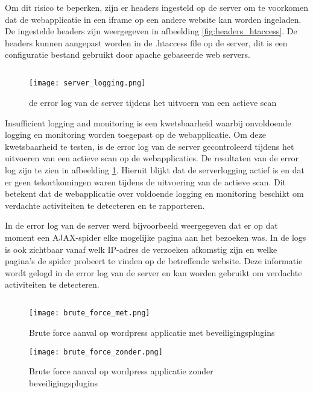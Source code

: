 Om dit risico te beperken, zijn er headers ingesteld op de server om te voorkomen dat de webapplicatie in een iframe op een 
andere website kan worden ingeladen. De ingestelde headers zijn weergegeven in afbeelding \ref{fig:headers_htaccess}. De 
headers kunnen aangepast worden in de .htaccess file op de server, dit is een configuratie bestand gebruikt door apache 
gebaseerde web servers.

\subsection{}
\begin{figure}
    \centering
    \texttt{[image: server\_logging.png]}
    \caption[de error log van de server tijdens het uitvoern van een actieve scan]{de error log van de server tijdens het uitvoern van een actieve scan}
    \label{fig:server_logging}
\end{figure}
Insufficient logging and monitoring is een kwetsbaarheid waarbij onvoldoende logging en monitoring worden toegepast op de 
webapplicatie. Om deze kwetsbaarheid te testen, is de error log van de server gecontroleerd tijdens het uitvoeren van een 
actieve scan op de webapplicaties. De resultaten van de error log zijn te zien in afbeelding \ref{fig:server_logging}. 
Hieruit blijkt dat de serverlogging actief is en dat er geen tekortkomingen waren tijdens de uitvoering van de actieve scan. 
Dit betekent dat de webapplicatie over voldoende logging en monitoring beschikt om verdachte activiteiten te detecteren en te 
rapporteren.

In de error log van de server werd bijvoorbeeld weergegeven dat er op dat moment een AJAX-spider elke mogelijke pagina aan 
het bezoeken was. In de logs is ook zichtbaar vanaf welk IP-adres de verzoeken afkomstig zijn en welke pagina's de spider 
probeert te vinden op de betreffende website. Deze informatie wordt gelogd in de error log van de server en kan worden 
gebruikt om verdachte activiteiten te detecteren.

\subsection{}
\begin{figure}
    \centering
    \texttt{[image: brute\_force\_met.png]}
    \caption[Brute force aanval op wordpress applicatie met beveiligingsplugins]{Brute force aanval op wordpress applicatie met beveiligingsplugins}
    \label{fig:brute_force_met}
\end{figure}
\begin{figure}
    \centering
    \texttt{[image: brute\_force\_zonder.png]}
    \caption[Brute force aanval op wordpress applicatie zonder beveiligingsplugins]{Brute force aanval op wordpress applicatie zonder beveiligingsplugins}
    \label{fig:brute_force_zonder}
\end{figure}

